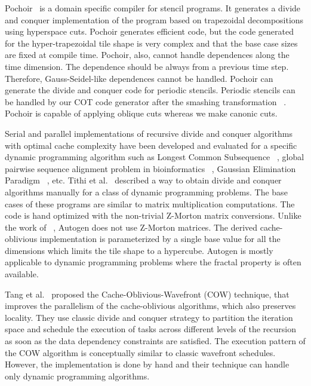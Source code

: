 Pochoir~\cite{Tang2011} is a domain specific compiler for stencil programs. It generates a divide and conquer implementation of the program based on trapezoidal decompositions using hyperspace cuts.  Pochoir generates efficient code, but the code generated for the hyper-trapezoidal tile shape is very complex and that the base case sizes are fixed at compile time.  Pochoir, also, cannot handle dependences along the time dimension.  The dependence should be always from a previous time step. Therefore, Gauss-Seidel-like dependences cannot be handled. Pochoir can generate the divide and conquer code for periodic stencils.  Periodic stencils can be handled by our COT code
generator after the smashing transformation ~\cite{sanjay-lcpc08,
uday-pact2014}.  Pochoir is capable of applying oblique cuts whereas we make canonic cuts.

Serial and parallel implementations of recursive divide and conquer algorithms with optimal cache complexity have been developed and evaluated for a specific dynamic programming algorithm such as Longest Common Subsequence ~\cite{rezaul-thesis, Chowdhury-2006-CDP}, global pairwise sequence alignment problem in bioinformatics ~\cite{Chowdhury-2010soda}, Gaussian Elimination Paradigm ~\cite{Chowdhury2010GEP}, etc. Tithi et al.~\cite{tithi-ipdps2015} described a way to obtain divide and conquer algorithms manually for a class of dynamic programming problems. The base cases of these programs are similar to matrix multiplication computations. The code is hand optimized with the non-trivial Z-Morton matrix conversions.  Unlike the work of ~\cite{tithi-ipdps2015}, Autogen does not use Z-Morton matrices. The derived cache-oblivious implementation is parameterized by a single base value for all the dimensions which limits the tile shape to a hypercube.  Autogen is mostly applicable to dynamic programming problems where the fractal property is often available.

Tang et al.~\cite{Tang-COW} proposed the Cache-Oblivious-Wavefront (COW) technique, that improves the parallelism of the cache-oblivious algorithms, which also preserves locality. They use classic divide and conquer strategy to partition the iteration space and schedule the execution of tasks across different levels of the recursion as soon as the data dependency constraints are satisfied. The execution pattern of the COW algorithm is conceptually similar to classic wavefront schedules. However, the implementation is done by hand and their technique can handle only dynamic programming algorithms.

